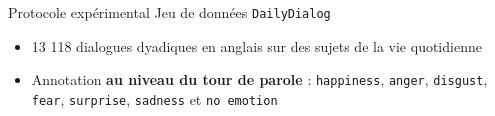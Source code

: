 \documentclass[11pt,aspectratio=169]{beamer}
\begin{document}
\begin{frame}{Protocole expérimental}
    Jeu de données \texttt{DailyDialog}~
    \begin{itemize}
        \item 13 118 dialogues dyadiques en anglais sur des sujets de la vie quotidienne
        \item Annotation \textcolor{roose}{\bf au niveau du tour de parole} : \texttt{happiness}, \texttt{anger}, \texttt{disgust}, \texttt{fear}, \texttt{surprise}, \texttt{sadness} et \texttt{no emotion}
    \end{itemize}
\vspace*{5pt}
\end{frame}
\end{document}
